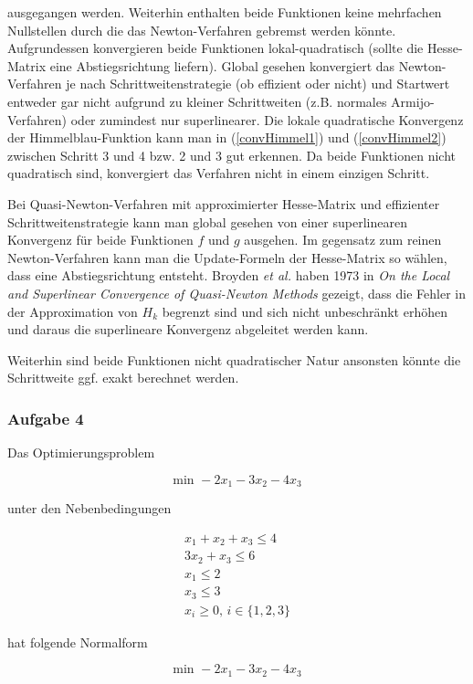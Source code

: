 \documentclass[a4paper, 12pt]{report}
\begin{document}
ausgegangen werden. Weiterhin enthalten beide Funktionen keine mehrfachen Nullstellen durch die das Newton-Verfahren
gebremst werden könnte. Aufgrundessen konvergieren beide Funktionen lokal-quadratisch (sollte die Hesse-Matrix eine
Abstiegsrichtung liefern). Global gesehen konvergiert das Newton-Verfahren je nach Schrittweitenstrategie
(ob effizient oder nicht) und Startwert entweder gar nicht aufgrund zu kleiner Schrittweiten (z.B. normales Armijo-Verfahren)
oder zumindest nur superlinearer. Die lokale quadratische Konvergenz der Himmelblau-Funktion kann man in (\ref{convHimmel1})
und (\ref{convHimmel2}) zwischen Schritt 3 und 4 bzw. 2 und 3 gut erkennen. Da beide Funktionen nicht quadratisch sind,
konvergiert das Verfahren nicht in einem einzigen Schritt.\par
Bei Quasi-Newton-Verfahren mit approximierter Hesse-Matrix und effizienter Schrittweitenstrategie kann man global gesehen
von einer superlinearen Konvergenz für beide Funktionen $f$ und $g$ ausgehen. Im gegensatz zum reinen Newton-Verfahren kann man 
die Update-Formeln der Hesse-Matrix so wählen, dass eine Abstiegsrichtung entsteht. Broyden \textit{et al.} haben 1973
in \textit{On the Local and Superlinear Convergence of Quasi-Newton Methods} gezeigt, dass die Fehler in der Approximation
von $H_k$ begrenzt sind und sich nicht unbeschränkt erhöhen und daraus die superlineare Konvergenz
abgeleitet werden kann.\par
Weiterhin sind beide Funktionen nicht quadratischer Natur ansonsten könnte die Schrittweite ggf. exakt berechnet werden.

\subsubsection{Aufgabe 4}

Das Optimierungsproblem

$$ \text{min } -2x_1 - 3x_2 - 4x_3$$

unter den Nebenbedingungen

\begin{align*} 
  x_1 + x_2 + x_3 \leq 4\\
  3x_2 + x_3 \leq 6\\
  x_1 \leq 2\\
  x_3 \leq 3\\
  x_i \geq 0 \text{, } i \in \{1, 2, 3\}
\end{align*}

hat folgende Normalform

$$ \text{min } -2x_1 - 3x_2 - 4x_3$$
\end{document}
